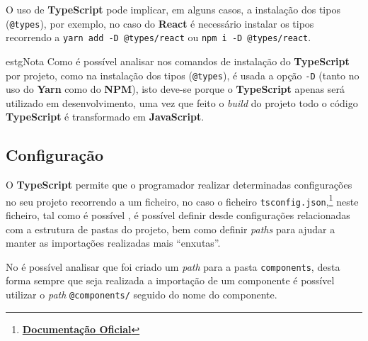 O uso de \textbf{TypeScript} pode implicar, em alguns casos, a instalação dos tipos (\texttt{@types}), por exemplo, no caso do \textbf{React} é necessário instalar os tipos recorrendo a \texttt{yarn add -D @types/react} ou \texttt{npm i -D @types/react}.

\begin{mybox}{estg}{Nota}
	Como é possível analisar nos comandos de instalação do \textbf{TypeScript} por projeto, como na instalação dos tipos (\texttt{@types}), é usada a opção \texttt{-D} (tanto no uso do \textbf{Yarn} como do \textbf{NPM}), isto deve-se porque o \textbf{TypeScript} apenas será utilizado em desenvolvimento, uma vez que feito o \textit{build} do projeto todo o código \textbf{TypeScript} é transformado em \textbf{JavaScript}.
\end{mybox}

\subsection{Configuração}

O \textbf{TypeScript} permite que o programador realizar determinadas configurações no seu projeto recorrendo a um ficheiro, no caso o ficheiro \texttt{tsconfig.json},\footnote{\textbf{\href{https://www.typescriptlang.org/tsconfig}{Documentação Oficial}}} neste ficheiro, tal como é possível , é possível definir desde configurações relacionadas com a estrutura de pastas do projeto, bem como definir \textit{paths} para ajudar a manter as importações realizadas mais ``enxutas''.

No  é possível analisar que foi criado um \textit{path} para a pasta \texttt{components}, desta forma sempre que seja realizada a importação de um componente é possível utilizar o \textit{path} \texttt{@components/} seguido do nome do componente.